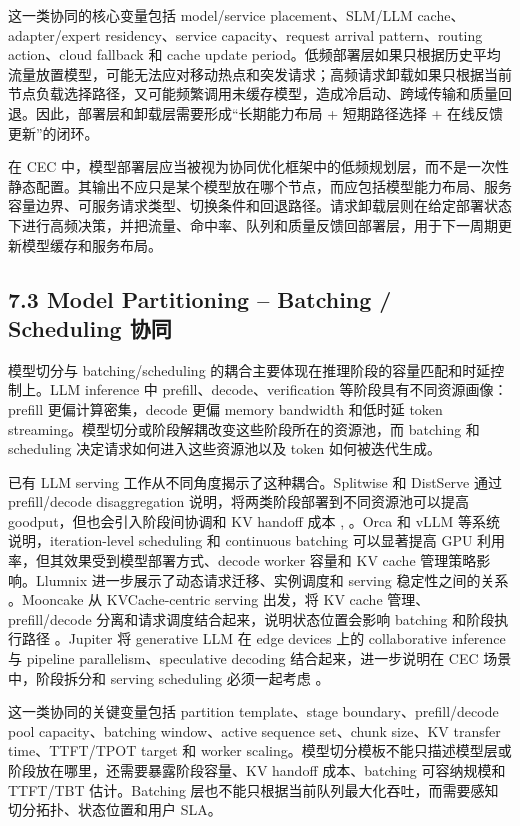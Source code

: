 这一类协同的核心变量包括 model/service placement、SLM/LLM cache、adapter/expert residency、service capacity、request arrival pattern、routing action、cloud fallback 和 cache update period。低频部署层如果只根据历史平均流量放置模型，可能无法应对移动热点和突发请求；高频请求卸载如果只根据当前节点负载选择路径，又可能频繁调用未缓存模型，造成冷启动、跨域传输和质量回退。因此，部署层和卸载层需要形成“长期能力布局 + 短期路径选择 + 在线反馈更新”的闭环。

在 CEC 中，模型部署层应当被视为协同优化框架中的低频规划层，而不是一次性静态配置。其输出不应只是某个模型放在哪个节点，而应包括模型能力布局、服务容量边界、可服务请求类型、切换条件和回退路径。请求卸载层则在给定部署状态下进行高频决策，并把流量、命中率、队列和质量反馈回部署层，用于下一周期更新模型缓存和服务布局。


\subsection*{7.3 Model Partitioning -- Batching / Scheduling 协同}

模型切分与 batching/scheduling 的耦合主要体现在推理阶段的容量匹配和时延控制上。LLM inference 中 prefill、decode、verification 等阶段具有不同资源画像：prefill 更偏计算密集，decode 更偏 memory bandwidth 和低时延 token streaming。模型切分或阶段解耦改变这些阶段所在的资源池，而 batching 和 scheduling 决定请求如何进入这些资源池以及 token 如何被迭代生成。

已有 LLM serving 工作从不同角度揭示了这种耦合。Splitwise 和 DistServe 通过 prefill/decode disaggregation 说明，将两类阶段部署到不同资源池可以提高 goodput，但也会引入阶段间协调和 KV handoff 成本 \cite{patel2024splitwise}, \cite{zhong2024distserve}。Orca \cite{yu2022orca} 和 vLLM \cite{kwon2023efficient} 等系统说明，iteration-level scheduling 和 continuous batching 可以显著提高 GPU 利用率，但其效果受到模型部署方式、decode worker 容量和 KV cache 管理策略影响。Llumnix 进一步展示了动态请求迁移、实例调度和 serving 稳定性之间的关系 \cite{sun2024llumnix}。Mooncake 从 KVCache-centric serving 出发，将 KV cache 管理、prefill/decode 分离和请求调度结合起来，说明状态位置会影响 batching 和阶段执行路径 \cite{qin2025mooncake}。Jupiter 将 generative LLM 在 edge devices 上的 collaborative inference 与 pipeline parallelism、speculative decoding 结合起来，进一步说明在 CEC 场景中，阶段拆分和 serving scheduling 必须一起考虑 \cite{ye2025jupiter}。

这一类协同的关键变量包括 partition template、stage boundary、prefill/decode pool capacity、batching window、active sequence set、chunk size、KV transfer time、TTFT/TPOT target 和 worker scaling。模型切分模板不能只描述模型层或阶段放在哪里，还需要暴露阶段容量、KV handoff 成本、batching 可容纳规模和 TTFT/TBT 估计。Batching 层也不能只根据当前队列最大化吞吐，而需要感知切分拓扑、状态位置和用户 SLA。


